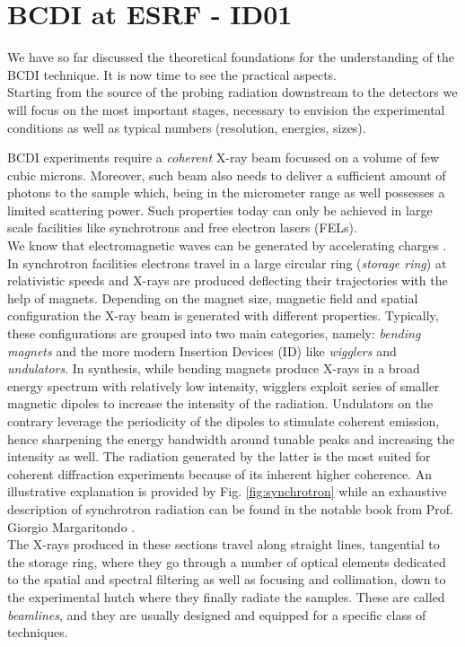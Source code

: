 \section{BCDI at ESRF - ID01}\label{chp:id01}

We have so far discussed the theoretical foundations for the understanding of the BCDI technique. It is now time to 
see the practical aspects. \\
Starting from the source of the probing radiation downstream to the detectors we will focus on the most important stages, 
necessary to envision the experimental conditions as well as typical numbers (resolution, energies, sizes).

BCDI experiments require a \textit{coherent} X-ray beam focussed on a volume of few cubic microns. Moreover, such beam also needs 
to deliver a sufficient amount of photons to the sample which, being in the micrometer range as well possesses a limited scattering 
power. Such properties today can only be achieved in large scale facilities like synchrotrons and free electron lasers (FELs). \\
We know that electromagnetic waves can be generated by accelerating charges \cite{griffiths}. In synchrotron facilities 
electrons travel in a large circular ring (\textit{storage ring}) at relativistic speeds and X-rays are produced deflecting their trajectories 
with the help of magnets. Depending on the magnet size, magnetic field and spatial configuration the X-ray beam is generated 
with different properties. Typically, these configurations are grouped into two main categories, namely: \textit{bending magnets} 
and the more modern Insertion Devices (ID) like \textit{wigglers} and \textit{undulators}. In synthesis, while bending magnets 
produce X-rays in a broad energy spectrum with relatively low intensity, wigglers exploit series of smaller magnetic dipoles 
to increase the intensity of the radiation. Undulators on the contrary leverage the periodicity of the dipoles to stimulate 
coherent emission, hence sharpening the energy bandwidth around tunable peaks and increasing the intensity as well. 
The radiation generated by the latter is the most suited for coherent diffraction experiments because of its inherent 
higher coherence.
An illustrative explanation is provided by Fig. \ref{fig:synchrotron} while an exhaustive description of synchrotron radiation can be found 
in the notable book from Prof. Giorgio Margaritondo \cite{margaritondo}.\\
The X-rays produced in these sections travel along straight lines, tangential to the storage ring, where they go through 
a number of optical elements dedicated to the spatial and spectral filtering as well as focusing and collimation, down 
to the experimental hutch where they finally radiate the samples. These are called \textit{beamlines}, and they are usually 
designed and equipped for a specific class of techniques. 


